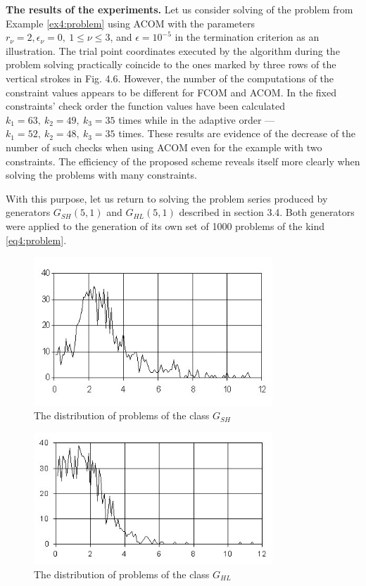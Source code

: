 \documentclass[graybox]{svmult}
\begin{document}
\textbf{The results of the experiments.} Let us consider solving of the problem from Example \ref{ex4:problem} using ACOM with the parameters $r_\nu=2, \epsilon_\nu=0,\: 1\le \nu\le 3$, and $\epsilon=10^{-5}$ in the termination criterion as an illustration. The trial point coordinates executed by the algorithm during the
problem solving practically coincide to the ones marked by three rows of the vertical strokes in Fig. 4.6. However, the number of the computations of the constraint values appears to be different for FCOM and ACOM. In the fixed constraints’ check order the function values have been calculated $k_1 =63,\: k_2 =49,\: k_3 =35$ times while in the adaptive order --- $k_1 =52,\: k_2 =48,\:
k_3 =35$ times. These results are evidence of the decrease of the number of such checks when using ACOM even for the example with two constraints. The efficiency of the proposed scheme reveals itself more clearly when solving the problems with many constraints.

With this purpose, let us return to solving the problem series produced by generators $G_{SH}(5,1)$ and $G_{HL} (5,1)$ described in section 3.4. Both generators were applied to the generation of
its own set of 1000 problems of the kind \eqref{eq4:problem}.

\begin{figure}[h]
  \label{fig:4_11}
  \centering
  \includegraphics[width=0.8\textwidth]{figures/4_11.jpg}
  \caption{The distribution of problems of the class $G_{SH}$}
\end{figure}

\begin{figure}[h]
  \label{fig:4_12}
  \centering
  \includegraphics[width=0.8\textwidth]{figures/4_12.jpg}
  \caption{The distribution of problems of the class $G_{HL}$}
\end{figure}
\end{document}

